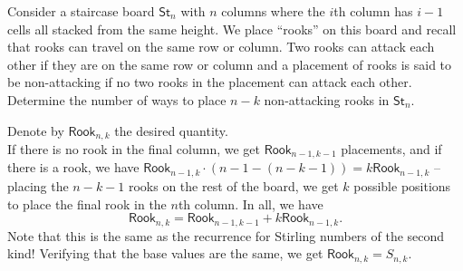 		\begin{problem}
			Consider a staircase board $\mathsf{St}_n$ with $n$ columns where the $i$th column has $i-1$ cells all stacked from the same height. We place ``rooks'' on this board and recall that rooks can travel on the same row or column. Two rooks can attack each other if they are on the same row or column and a placement of rooks is said to be non-attacking if no two rooks in the placement can attack each other. Determine the number of ways to place $n-k$ non-attacking rooks in $\mathsf{St}_n$.
		\end{problem}
		\begin{solution*}
			Denote by $\mathsf{Rook}_{n,k}$ the desired quantity.\\
			If there is no rook in the final column, we get $\mathsf{Rook}_{n-1,k-1}$ placements, and if there is a rook, we have $\mathsf{Rook}_{n-1,k} \cdot (n-1 - (n-k-1)) = k \mathsf{Rook}_{n-1,k}$ -- placing the $n-k-1$ rooks on the rest of the board, we get $k$ possible positions to place the final rook in the $n$th column. In all, we have
			\[ \mathsf{Rook}_{n,k} = \mathsf{Rook}_{n-1,k-1} + k \mathsf{Rook}_{n-1,k}. \]
			Note that this is the same as the recurrence for Stirling numbers of the second kind! Verifying that the base values are the same, we get $\mathsf{Rook}_{n,k} = S_{n,k}$.
		\end{solution*}